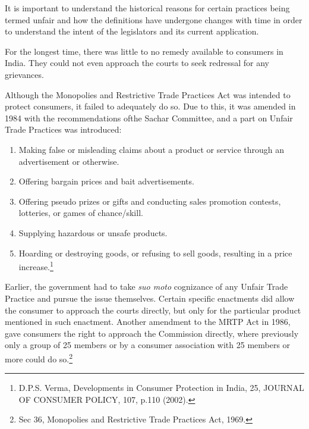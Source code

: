 \begin{multicols}{2}
\vspace{-.15cm}


\vspace{-.15cm}

\noi
It is important to understand the historical reasons for certain practices being termed unfair and
how the definitions have undergone changes with time in order to understand the intent of the
legislators and its current application.

\noi
For the longest time, there was little to no remedy available to consumers in India. They could
not even approach the courts to seek redressal for any grievances.

\noi
Although the Monopolies and Restrictive Trade Practices Act was intended to protect
consumers, it failed to adequately do so. Due to this, it was amended in 1984 with the
recommendations ofthe Sachar Committee, and a part on Unfair Trade Practices was introduced:

\vspace{-.4cm}

\begin{enumerate}
\itemsep=0pt

\item[1)] Making false or misleading claims about a product or service through an advertisement or otherwise.

\item[2)] Offering bargain prices and bait advertisements.

\item[3)] Offering pseudo prizes or gifts and conducting sales promotion contests, lotteries, or games of chance/skill.

\item[4)] Supplying hazardous or unsafe products.

\item[5)] Hoarding or destroying goods, or refusing to sell goods, resulting in a price increase.\footnote{D.P.S. Verma, Developments in Consumer Protection in India, 25, JOURNAL OF CONSUMER POLICY, 107, p.110 (2002).}
\end{enumerate}

\vspace{-.4cm}

\noi
Earlier, the government had to take \textit{suo moto} cognizance of any Unfair Trade Practice and pursue
the issue themselves. Certain specific enactments did allow the consumer to approach the courts
directly, but only for the particular product mentioned in such enactment. Another amendment
to the MRTP Act in 1986, gave consumers the right to approach the Commission directly,
where previously only a group of 25 members or by a consumer association with 25 members
or more could do so.\footnote{Sec 36, Monopolies and Restrictive Trade Practices Act, 1969.}


\end{multicols}
